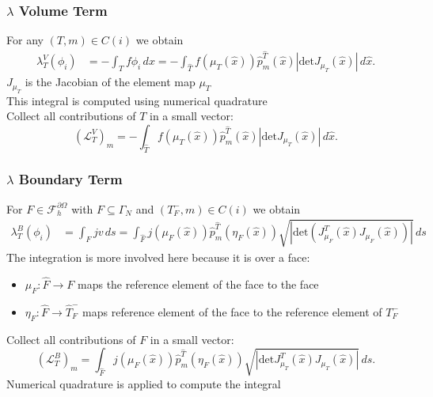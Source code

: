 \documentclass[aspectratio=169,11pt]{beamer}
\theoremstyle{definition}
\begin{document}
\begin{frame}
\frametitle{$\lambda$ Volume Term}
For any $(T,m)\in C(i)$ we obtain
\begin{equation*}
\begin{split}
\lambda_T^V(\phi_i) &= - \int_T f \phi_i \,dx =
- \int_{\hat T} f(\mu_T(\hat x)) \hat p_m^{\hat T}(\hat x) |\text{det} J_{\mu_T}(\hat x)|\, d\hat x .
\end{split}
\end{equation*}
$J_{\mu_T}$ is the Jacobian of the element map $\mu_T$\\
\medskip
This integral is computed using numerical quadrature\\
\medskip
Collect all contributions of $T$ in a small vector:
\begin{equation*}
(\mathcal{L}_T^V)_m = - \int_{\hat T} f(\mu_T(\hat x)) \hat p_m^{\hat T}(\hat x)
|\text{det} J_{\mu_T}(\hat x)|\, d\hat x.
\end{equation*}
\end{frame}

\begin{frame}
\frametitle{$\lambda$ Boundary Term}
For $F\in\mathcal{F}_h^{\partial\Omega}$ with $F\subseteq\Gamma_N$
and $(T_F^-,m)\in C(i)$ we obtain
\begin{equation*}
\begin{split}
\lambda_T^B(\phi_i) &= \int_{F} j v\,ds =
\int_{\hat F} j(\mu_F(\hat x)) \hat p_m^{\hat T}(\eta_F(\hat x))
\sqrt{|\text{det} (J^T_{\mu_F}(\hat x)J_{\mu_F}(\hat x))|} \,ds
\end{split}
\end{equation*}
The integration is more involved here because it is over a face:
\begin{itemize}
\item $\mu_F: \hat F \to F$ maps the reference element of the face to the face
\item $\eta_F: \hat F \to \hat T_F^-$ maps reference
element of the face to the reference element of $T_F^-$
\end{itemize}
Collect all contributions of $F$ in a small vector:
\begin{equation*}
(\mathcal{L}_T^B)_m =
\int_{\hat F} j(\mu_F(\hat x)) \hat p_m^{\hat T}(\eta_F(\hat x))
\sqrt{|\text{det} J^T_{\mu_T}(\hat x)J_{\mu_T}(\hat x)|} \,ds .
\end{equation*}
Numerical quadrature is applied to compute the integral
\end{frame}
\end{document}
